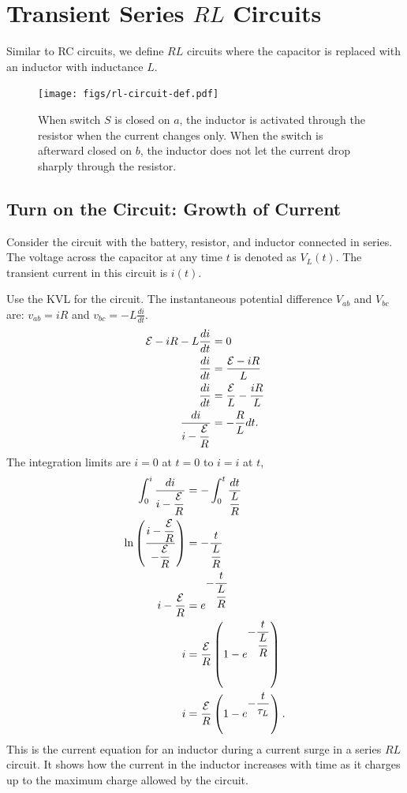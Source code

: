 \documentclass[12pt,b4paper]{article}
\begin{document}
\section{Transient Series $RL$ Circuits}
Similar to RC circuits, we define $RL$ circuits where the capacitor is replaced with an inductor with inductance $L$.
\begin{figure}[H]
    \centering
    \texttt{[image: figs/rl-circuit-def.pdf]}
    \caption{When switch $S$ is closed on $a$, the inductor is activated through the resistor when the current changes only. When the switch is afterward closed on $b$, the inductor does not let the current drop sharply through the resistor.}
    \label{fig:rc-circuit-def}
\end{figure}
\subsection{Turn on the Circuit: Growth of Current}
Consider the circuit with the battery, resistor, and inductor connected in series. The voltage across the capacitor at any time $t$ is denoted as $V_L(t)$. The transient current in this circuit is $i(t)$.

Use the KVL for the circuit. The instantaneous potential difference $V_{ab}$ and $V_{bc}$ are: $v_{ab}=iR$ and $\displaystyle v_{bc}=-L\frac{di}{dt}$.
\begin{align}
    \mathcal{E}-iR-L\frac{di}{dt}&=0\notag\\
    \frac{di}{dt}&=\frac{\mathcal{E}-iR}{L}\notag\\
    \frac{di}{dt}&=\frac{\mathcal{E}}{L}-\frac{iR}{L}\notag\\
    \frac{di}{\displaystyle i-\frac{\mathcal{E}}{R}}&=-\frac{R}{L}dt.
\end{align}
The integration limits are $i=0$ at $t=0$ to $i=i$ at $t$,
\begin{align}
    \int_0^i\frac{di}{\displaystyle i-\frac{\mathcal{E}}{R}}&=-\int_0^t\frac{dt}{\displaystyle\frac{L}{R}}\notag\\
    \ln\left(\frac{\displaystyle i-\frac{\mathcal{E}}{R}}{\displaystyle-\frac{\mathcal{E}}{R}}\right)&=-\frac{t}{\displaystyle\frac{L}{R}}\notag\\
    \displaystyle i-\frac{\mathcal{E}}{R}&=e^{\displaystyle-\frac{t}{\displaystyle\frac{L}{R}}}\notag\\
    i&=\frac{\mathcal{E}}{R}\left(1-e^{\displaystyle-\frac{t}{\displaystyle\frac{L}{R}}}\right)\notag\\
    i&=\frac{\mathcal{E}}{R}\left(1-e^{\displaystyle-\frac{t}{\tau_L}}\right).\label{eq:increasing-current-eq-rl-circuit}
\end{align}
This is the current equation for an inductor during a current surge in a series $RL$ circuit. It shows how the current in the inductor increases with time as it charges up to the maximum charge allowed by the circuit.
\end{document}
